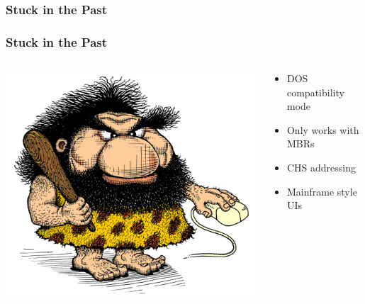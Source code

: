 \subsubsection{Stuck in the Past}
\begin{frame}\frametitle{Stuck in the Past}
  \begin{columns}
    \begin{column}{.5\linewidth}
      \includegraphics[scale=0.3]{img/linkman}
       \end{column}
    \begin{column}{.5\linewidth}
      \begin{itemize}
      \item DOS compatibility mode
      \item Only works with MBRs
      \item CHS addressing
      \item Mainframe style UIs\newline
      \end{itemize}
    \end{column}
  \end{columns}
\end{frame}


